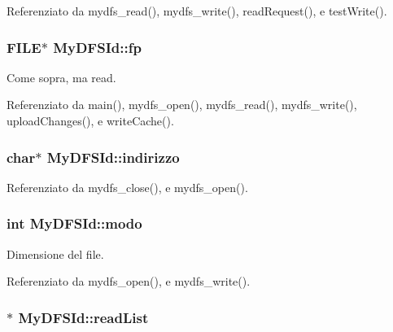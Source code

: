 Referenziato da mydfs\+\_\+read(), mydfs\+\_\+write(), read\+Request(), e test\+Write().

\hypertarget{structMyDFSId_ae2badd91d3b506420a9e49554df8212d}{
\subsubsection[{fp}]{\setlength{\rightskip}{0pt plus 5cm}F\+I\+L\+E$\ast$ My\+D\+F\+S\+Id\+::fp}}\label{structMyDFSId_ae2badd91d3b506420a9e49554df8212d}


Come sopra, ma read. 



Referenziato da main(), mydfs\+\_\+open(), mydfs\+\_\+read(), mydfs\+\_\+write(), upload\+Changes(), e write\+Cache().

\hypertarget{structMyDFSId_ac8c10a1a5b18776bf5e5585ee9e26331}{
\subsubsection[{indirizzo}]{\setlength{\rightskip}{0pt plus 5cm}char$\ast$ My\+D\+F\+S\+Id\+::indirizzo}}\label{structMyDFSId_ac8c10a1a5b18776bf5e5585ee9e26331}


Referenziato da mydfs\+\_\+close(), e mydfs\+\_\+open().

\hypertarget{structMyDFSId_a98bc5ce1a7734459d8b81c997da4e9f0}{
\subsubsection[{modo}]{\setlength{\rightskip}{0pt plus 5cm}int My\+D\+F\+S\+Id\+::modo}}\label{structMyDFSId_a98bc5ce1a7734459d8b81c997da4e9f0}


Dimensione del file. 



Referenziato da mydfs\+\_\+open(), e mydfs\+\_\+write().

\hypertarget{structMyDFSId_a8a4360512d45c22b6d8e980967c7dd32}{
\subsubsection[{read\+List}]{$\ast$ My\+D\+F\+S\+Id\+::read\+List}}\label{structMyDFSId_a8a4360512d45c22b6d8e980967c7dd32}


